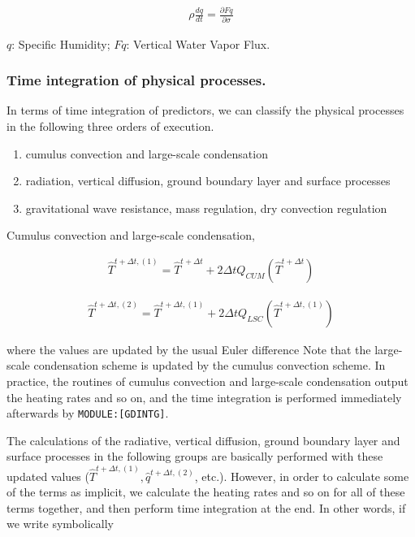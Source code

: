 \begin{eqnarray}
  \rho \frac{d {q}}{d {t}} = \frac{\partial{Fq}}{\partial {\sigma}}
\end{eqnarray}

\(q\): Specific Humidity; \(F{q}\): Vertical Water Vapor Flux.

\hypertarget{time-integration-of-physical-processes.}{%
\subsubsection{Time integration of physical
processes.}\label{time-integration-of-physical-processes.}}

In terms of time integration of predictors, we can classify the physical
processes in the following three orders of execution.

\begin{enumerate}
\def\labelenumi{\arabic{enumi}.}
\item
  cumulus convection and large-scale condensation
\item
  radiation, vertical diffusion, ground boundary layer and surface
  processes
\item
  gravitational wave resistance, mass regulation, dry convection
  regulation
\end{enumerate}

Cumulus convection and large-scale condensation,

\begin{eqnarray}
  \hat{T}^{t+\Delta t,(1)} = \hat{T}^{t+\Delta t}
                         +  2 \Delta t Q_{CUM}(\hat{T}^{t+\Delta t})
\end{eqnarray}

\begin{eqnarray}
  \hat{T}^{t+\Delta t,(2)} = \hat{T}^{t+\Delta t,(1)}
                         +  2 \Delta t Q_{LSC}(\hat{T}^{t+\Delta t,(1)})
\end{eqnarray}

where the values are updated by the usual Euler difference Note that the
large-scale condensation scheme is updated by the cumulus convection
scheme. In practice, the routines of cumulus convection and large-scale
condensation output the heating rates and so on, and the time
integration is performed immediately afterwards by
\texttt{MODULE:{[}GDINTG{]}}.

The calculations of the radiative, vertical diffusion, ground boundary
layer and surface processes in the following groups are basically
performed with these updated values
(\(\hat{T}^{t+\Delta t,(1)}, \hat{q}^{t+\Delta t,(2)}\), etc.). However,
in order to calculate some of the terms as implicit, we calculate the
heating rates and so on for all of these terms together, and then
perform time integration at the end. In other words, if we write
symbolically

